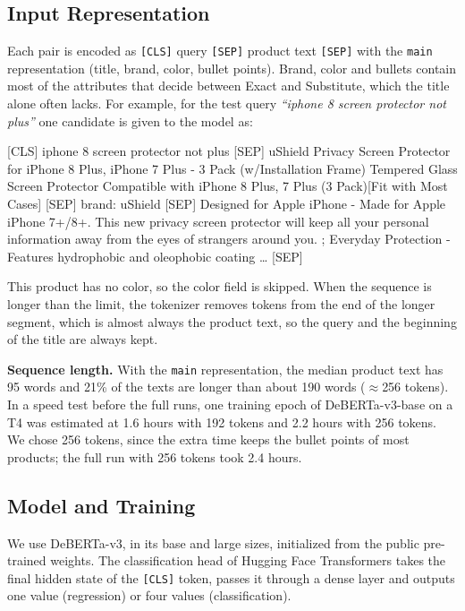 \documentclass[12pt,a4paper]{report}
\begin{document}
\subsection{Input Representation}
Each pair is encoded as \texttt{[CLS]} query \texttt{[SEP]} product text \texttt{[SEP]} with the \texttt{main} representation (title, brand, color, bullet points). Brand, color and bullets contain most of the attributes that decide between Exact and Substitute, which the title alone often lacks. For example, for the test query \emph{``iphone 8 screen protector not plus''} one candidate is given to the model as:

\begin{center}
\begin{minipage}{0.92\linewidth}
\footnotesize\ttfamily\raggedright
[CLS] iphone 8 screen protector not plus [SEP] uShield Privacy Screen Protector for iPhone 8 Plus, iPhone 7 Plus - 3 Pack (w/Installation Frame) Tempered Glass Screen Protector Compatible with iPhone 8 Plus, 7 Plus (3 Pack)[Fit with Most Cases] [SEP] brand: uShield [SEP] Designed for Apple iPhone - Made for Apple iPhone 7+/8+. This new privacy screen protector will keep all your personal information away from the eyes of strangers around you. ; Everyday Protection - Features hydrophobic and oleophobic coating \ldots{} [SEP]
\end{minipage}
\end{center}

This product has no color, so the color field is skipped. When the sequence is longer than the limit, the tokenizer removes tokens from the end of the longer segment, which is almost always the product text, so the query and the beginning of the title are always kept.

\textbf{Sequence length.} With the \texttt{main} representation, the median product text has 95 words and 21\% of the texts are longer than about 190 words ($\approx$256 tokens). In a speed test before the full runs, one training epoch of DeBERTa-v3-base on a T4 was estimated at 1.6 hours with 192 tokens and 2.2 hours with 256 tokens. We chose 256 tokens, since the extra time keeps the bullet points of most products; the full run with 256 tokens took 2.4 hours.

\subsection{Model and Training}
We use DeBERTa-v3, in its base and large sizes, initialized from the public pre-trained weights. The classification head of Hugging Face Transformers takes the final hidden state of the \texttt{[CLS]} token, passes it through a dense layer and outputs one value (regression) or four values (classification).
\end{document}

